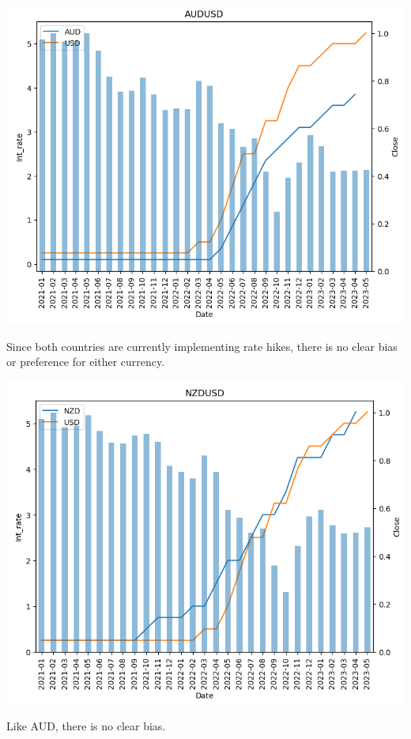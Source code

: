 \documentclass{article}
\begin{document}
\begin{center}
   \includegraphics[scale=0.8]{p18.png}    
\end{center}
Since both countries are currently implementing rate hikes, there is no clear bias or preference for either currency.

\begin{center}
   \includegraphics[scale=0.8]{p19.png}    
\end{center}
Like AUD, there is no clear bias.
\end{document}
